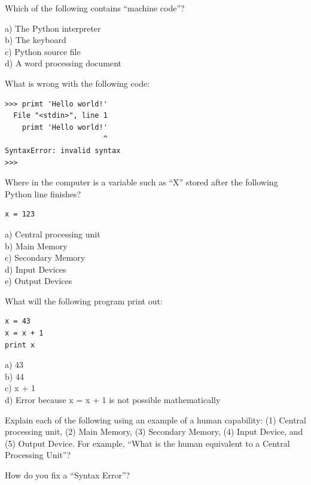 \begin{ex}
Which of the following contains ``machine code''?

a) The Python interpreter\\
b) The keyboard\\
c) Python source file\\
d) A word processing document
\end{ex}

\begin{ex}
What is wrong with the following code:

\beforeverb
\begin{verbatim}
>>> primt 'Hello world!'
  File "<stdin>", line 1
    primt 'Hello world!'
                       ^
SyntaxError: invalid syntax
>>> 
\end{verbatim}
\afterverb

\end{ex}

\begin{ex}
Where in the computer is a variable such as ``X'' stored 
after the following Python line finishes?

\beforeverb
\begin{verbatim}
x = 123
\end{verbatim}
\afterverb
%
a) Central processing unit\\
b) Main Memory\\
c) Secondary Memory\\
d) Input Devices\\
e) Output Devices
\end{ex}

\begin{ex}
What will the following program print out:

\beforeverb
\begin{verbatim}
x = 43
x = x + 1
print x
\end{verbatim}
\afterverb
%
a) 43\\
b) 44\\
c) x + 1\\
d) Error because x = x + 1 is not possible mathematically
\end{ex}

\begin{ex}
Explain each of the following using an example of a human capability: 
(1) Central processing unit, (2) Main Memory, (3) Secondary Memory, 
(4) Input Device, and
(5) Output Device.
For example, ``What is the human equivalent to a Central Processing Unit''? 
\end{ex}

\begin{ex}
How do you fix a ``Syntax Error''?
\end{ex}